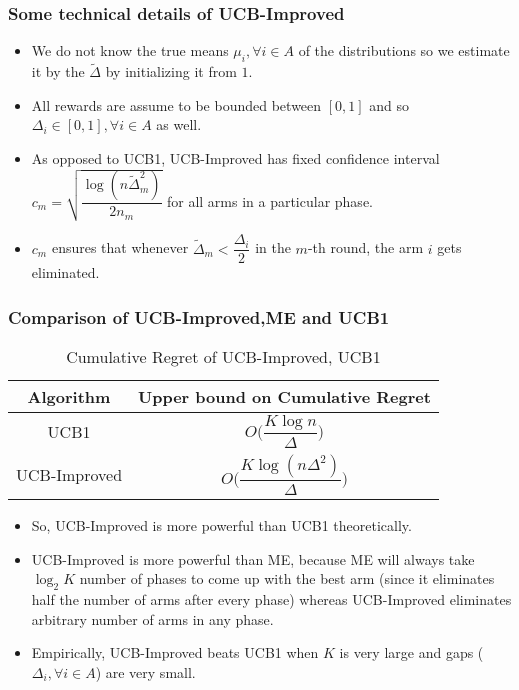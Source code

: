 \begin{frame}
\frametitle{Some technical details of UCB-Improved}
\begin{itemize}
\item<1-> We do not know the true means $\mu_i ,\forall i\in A$ of the distributions so we estimate it by the $\tilde{\Delta}$ by initializing it from $1$.
\item<2-> All rewards are assume to be bounded between $[0,1]$ and so $\Delta_{i}\in [0,1],\forall i\in A$ as well.
\item<3-> As opposed to UCB1, UCB-Improved has fixed confidence interval  $c_{m}=\sqrt{\dfrac{\log{(n\tilde{\Delta}_{m}^{2})}}{2 n_{m}}}$ for all arms in a particular phase.
\item<4-> $c_m$ ensures that whenever $\tilde{\Delta}_{m}<\dfrac{\Delta_i}{2}$ in the $m$-th round, the arm $i$ gets eliminated.
\end{itemize}
\end{frame}

\begin{frame}
\frametitle{Comparison of UCB-Improved,ME and UCB1}
\begin{table}
\caption{Cumulative Regret of UCB-Improved, UCB1}
\begin{center}
\begin{tabular}{|c|c|}
\toprule
Algorithm  & Upper bound on Cumulative Regret\\
\midrule
UCB1        &$O\bigg(\dfrac{K\log n}{\Delta} \bigg)$ \\\midrule
UCB-Improved      &$O\bigg(\dfrac{K\log (n \Delta^2)}{\Delta} \bigg)$\\\bottomrule
\end{tabular}
\end{center}
\end{table}

\begin{itemize}
\item<1-> So, UCB-Improved is more powerful than UCB1 theoretically.
\item<2-> UCB-Improved is more powerful than ME, because ME will always take $\log_{2} K$ number of phases to come up with the best arm (since it eliminates half the number of arms after every phase) whereas UCB-Improved eliminates arbitrary number of arms in any phase.
\item<3-> Empirically, UCB-Improved beats UCB1 when $K$ is very large and gaps ($\Delta_{i},\forall i\in A$) are very small.
\end{itemize}
\end{frame}

